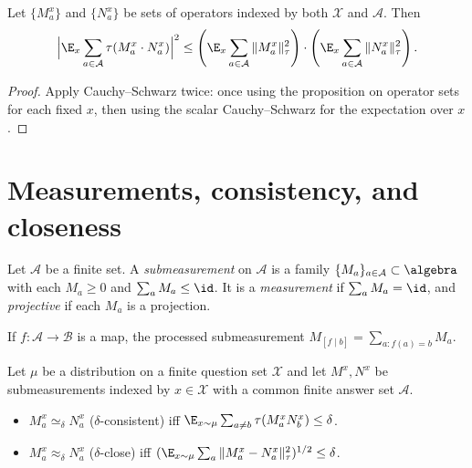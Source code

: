 \begin{corollary}
  \label{cor:cauchy-schwarz}
  Let $\{M^x_a\}$ and $\{N^x_a\}$ be sets of operators indexed by both
  $\mathcal{X}$ and $\mathcal{A}$. Then
  \[
    \Bigl|\E_x\sum_{a\in\mathcal{A}}\tau(M^x_a\cdot N^x_a)\Bigr|^2
    \le
    \left(\E_x\sum_{a\in\mathcal{A}}\|M^x_a\|_\tau^2\right)
    \cdot
    \left(\E_x\sum_{a\in\mathcal{A}}\|N^x_a\|_\tau^2\right).
  \]
\end{corollary}
\begin{proof}
  Apply Cauchy--Schwarz twice: once using the proposition on operator sets for
  each fixed $x$, then using the scalar Cauchy--Schwarz for the expectation
  over $x$.
\end{proof}

\section{Measurements, consistency, and closeness}

\begin{definition}
  \label{def:submeasurement}
  Let $\mathcal{A}$ be a finite set.
  A \emph{submeasurement} on $\mathcal{A}$ is a family
  $\{M_a\}_{a\in\mathcal{A}}\subset\algebra$ with each $M_a\ge 0$ and
  $\sum_a M_a\le\id$.
  It is a \emph{measurement} if $\sum_a M_a=\id$,
  and \emph{projective} if each $M_a$ is a projection.
\end{definition}

\begin{definition}\label{def:processed}
  If $f\colon\mathcal{A}\to\mathcal{B}$ is a map, the processed submeasurement
  $M_{[f\mid b]}=\sum_{a:f(a)=b}M_a$.
\end{definition}

\begin{definition}\label{def:consistency}
  Let $\mu$ be a distribution on a finite question set $\mathcal{X}$
  and let $M^x,N^x$ be submeasurements indexed by $x\in\mathcal{X}$
  with a common finite answer set $\mathcal{A}$.
  \begin{itemize}
    \item $M^x_a\simeq_\delta N^x_a$ ($\delta$-consistent) iff
      $\E_{x\sim\mu}\sum_{a\ne b}\tau(M^x_a N^x_b)\le\delta$.
    \item $M^x_a\approx_\delta N^x_a$ ($\delta$-close) iff
      $(\E_{x\sim\mu}\sum_a\|M^x_a-N^x_a\|_\tau^2)^{1/2}\le\delta$.
  \end{itemize}
\end{definition}

